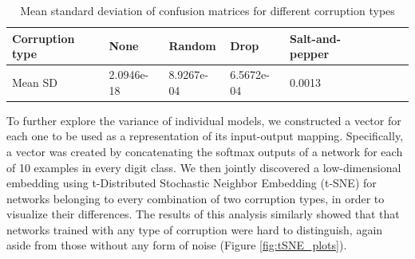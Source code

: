 \documentclass{article} %
\begin{document}
\begin{table}[ht]
\label{tab:sd_confusionMats}
\caption{Mean standard deviation of confusion matrices for different corruption types}
\begin{center}
\begin{tabular}{| l |  l |  l  | l | l | l | l | l |}
\hline
Corruption type & None & Random & Drop & Salt-and-pepper \\
\hline
Mean SD & 2.0946e-18 & 8.9267e-04 & 6.5672e-04 & 0.0013 \\
\hline
\end{tabular}
\end{center}
\end{table}

To further explore the variance of individual models, we constructed a vector for each one to be used as a representation of its input-output mapping. Specifically, a vector was created by concatenating the softmax outputs of a network for each of 10 examples in every digit class. We then jointly discovered a low-dimensional embedding using t-Distributed Stochastic Neighbor Embedding (t-SNE) for networks belonging to every combination of two corruption types, in order to visualize their differences. The results of this analysis similarly showed that that networks trained with any type of corruption were hard to distinguish, again aside from those without any form of noise (Figure \ref{fig:tSNE_plots}).
\end{document}
